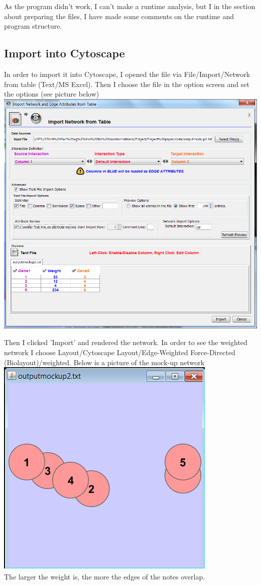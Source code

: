 As the program didn't work, I can't make a runtime analysis, but I in the section about preparing the files, I have made some comments on the runtime and program structure.

\newpage

\subsection*{Import into Cytoscape}

In order to import it into Cytoscape, I opened the file via File/Import/Network from table (Text/MS Excel). Then I choose the file in the option screen and set the options (see picture below)\\

\includegraphics[scale=0.60]{./pictures/cytoscape-options.png}

Then I clicked 'Import' and rendered the network. In order to see the weighted network I choose Layout/Cytoscape Layout/Edge-Weighted Force-Directed (Biolayout)/weighted. Below is a picture of the mock-up network\\

\includegraphics[scale=0.70]{./pictures/cytoscape-network.png}\\


The larger the weight is, the more the edges of the notes overlap.

\newpage

%

